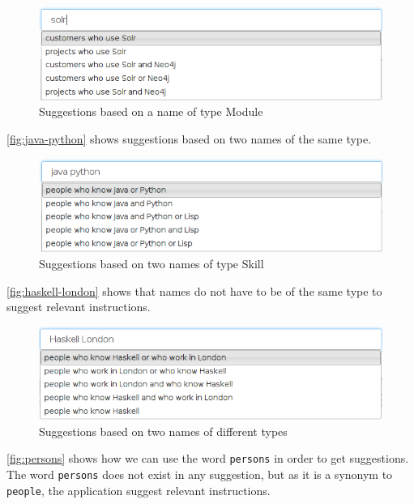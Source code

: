 \begin{figure}[H]
\includegraphics[scale=0.6,keepaspectratio,valign=t]{./gfx/solr.png}
\caption{Suggestions based on a name of type Module\label{fig:name-module}}
\end{figure}

\autoref{fig:java-python} shows suggestions based on two names of the same type.

\begin{figure}[H]
\includegraphics[scale=0.6,keepaspectratio,valign=t]{./gfx/java_python.png}
\caption{Suggestions based on two names  of type Skill\label{fig:java-python}}
\end{figure}

\autoref{fig:haskell-london} shows that names do not have to be of the same type to suggest relevant instructions.

\begin{figure}[H]
\includegraphics[scale=0.6,keepaspectratio,valign=t]{./gfx/haskell-london.png}
\caption{Suggestions based on two names of different types\label{fig:haskell-london}}
\end{figure}

\autoref{fig:persons} shows how we can use the word \texttt{persons} in order to get suggestions. The word \texttt{persons} does not exist in any suggestion, but as it is a synonym to \texttt{people}, the application suggest relevant instructions.

